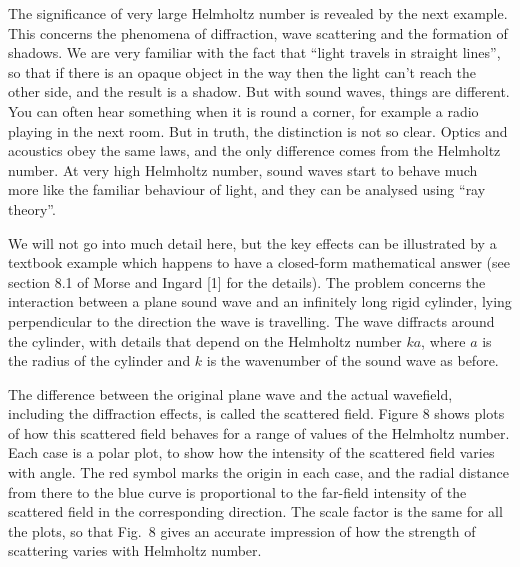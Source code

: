   The significance of very large Helmholtz number is revealed by the next 
  example. This concerns the phenomena of diffraction, wave scattering and the 
  formation of shadows. We are very familiar with the fact that ``light travels 
  in straight lines'', so that if there is an opaque object in the way then the 
  light can't reach the other side, and the result is a shadow. But with sound 
  waves, things are different. You can often hear something when it is round a 
  corner, for example a radio playing in the next room. But in truth, the 
  distinction is not so clear. Optics and acoustics obey the same laws, and the 
  only difference comes from the Helmholtz number. At very high Helmholtz 
  number, sound waves start to behave much more like the familiar behaviour of 
  light, and they can be analysed using ``ray theory''. 

  We will not go into much detail here, but the key effects can be illustrated 
  by a textbook example which happens to have a closed-form mathematical answer 
  (see section 8.1 of Morse and Ingard [1] for the details). The problem 
  concerns the interaction between a plane sound wave and an infinitely long 
  rigid cylinder, lying perpendicular to the direction the wave is travelling. 
  The wave diffracts around the cylinder, with details that depend on the 
  Helmholtz number $ka$, where $a$ is the radius of the cylinder and $k$ is the 
  wavenumber of the sound wave as before. 

  The difference between the original plane wave and the actual wavefield, 
  including the diffraction effects, is called the scattered field. Figure 8 
  shows plots of how this scattered field behaves for a range of values of the 
  Helmholtz number. Each case is a polar plot, to show how the intensity of the 
  scattered field varies with angle. The red symbol marks the origin in each 
  case, and the radial distance from there to the blue curve is proportional to 
  the far-field intensity of the scattered field in the corresponding 
  direction. The scale factor is the same for all the plots, so that Fig.\ 8 
  gives an accurate impression of how the strength of scattering varies with 
  Helmholtz number. 


